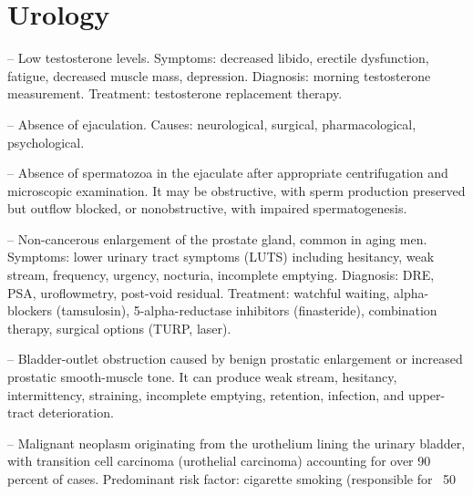 \chapter{Urology}

-- Low testosterone levels. Symptoms: decreased libido, erectile dysfunction, fatigue, decreased muscle mass, depression. Diagnosis: morning testosterone measurement. Treatment: testosterone replacement therapy.

-- Absence of ejaculation. Causes: neurological, surgical, pharmacological, psychological.

-- Absence of spermatozoa in the ejaculate after appropriate centrifugation and microscopic examination. It may be obstructive, with sperm production preserved but outflow blocked, or nonobstructive, with impaired spermatogenesis.

-- Non-cancerous enlargement of the prostate gland, common in aging men. Symptoms: lower urinary tract symptoms (LUTS) including hesitancy, weak stream, frequency, urgency, nocturia, incomplete emptying. Diagnosis: DRE, PSA, uroflowmetry, post-void residual. Treatment: watchful waiting, alpha-blockers (tamsulosin), 5-alpha-reductase inhibitors (finasteride), combination therapy, surgical options (TURP, laser).

-- Bladder-outlet obstruction caused by benign prostatic enlargement or increased prostatic smooth-muscle tone. It can produce weak stream, hesitancy, intermittency, straining, incomplete emptying, retention, infection, and upper-tract deterioration.

-- Malignant neoplasm originating from the urothelium lining the urinary bladder, with transition cell carcinoma (urothelial carcinoma) accounting for over 90 percent of cases. Predominant risk factor: cigarette smoking (responsible for ~50%

